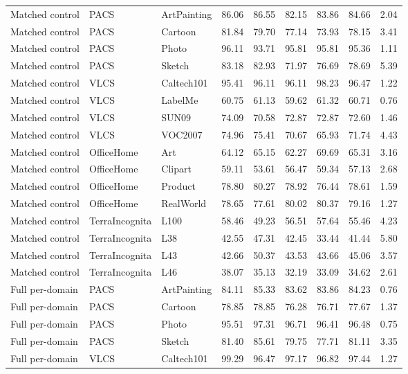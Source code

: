 \begin{longtable}{lllrrrrrr}
Matched control & PACS & ArtPainting & 86.06 & 86.55 & 82.15 & 83.86 & 84.66 & 2.04 \\
Matched control & PACS & Cartoon & 81.84 & 79.70 & 77.14 & 73.93 & 78.15 & 3.41 \\
Matched control & PACS & Photo & 96.11 & 93.71 & 95.81 & 95.81 & 95.36 & 1.11 \\
Matched control & PACS & Sketch & 83.18 & 82.93 & 71.97 & 76.69 & 78.69 & 5.39 \\
Matched control & VLCS & Caltech101 & 95.41 & 96.11 & 96.11 & 98.23 & 96.47 & 1.22 \\
Matched control & VLCS & LabelMe & 60.75 & 61.13 & 59.62 & 61.32 & 60.71 & 0.76 \\
Matched control & VLCS & SUN09 & 74.09 & 70.58 & 72.87 & 72.87 & 72.60 & 1.46 \\
Matched control & VLCS & VOC2007 & 74.96 & 75.41 & 70.67 & 65.93 & 71.74 & 4.43 \\
Matched control & OfficeHome & Art & 64.12 & 65.15 & 62.27 & 69.69 & 65.31 & 3.16 \\
Matched control & OfficeHome & Clipart & 59.11 & 53.61 & 56.47 & 59.34 & 57.13 & 2.68 \\
Matched control & OfficeHome & Product & 78.80 & 80.27 & 78.92 & 76.44 & 78.61 & 1.59 \\
Matched control & OfficeHome & RealWorld & 78.65 & 77.61 & 80.02 & 80.37 & 79.16 & 1.27 \\
Matched control & TerraIncognita & L100 & 58.46 & 49.23 & 56.51 & 57.64 & 55.46 & 4.23 \\
Matched control & TerraIncognita & L38 & 42.55 & 47.31 & 42.45 & 33.44 & 41.44 & 5.80 \\
Matched control & TerraIncognita & L43 & 42.66 & 50.37 & 43.53 & 43.66 & 45.06 & 3.57 \\
Matched control & TerraIncognita & L46 & 38.07 & 35.13 & 32.19 & 33.09 & 34.62 & 2.61 \\
Full per-domain & PACS & ArtPainting & 84.11 & 85.33 & 83.62 & 83.86 & 84.23 & 0.76 \\
Full per-domain & PACS & Cartoon & 78.85 & 78.85 & 76.28 & 76.71 & 77.67 & 1.37 \\
Full per-domain & PACS & Photo & 95.51 & 97.31 & 96.71 & 96.41 & 96.48 & 0.75 \\
Full per-domain & PACS & Sketch & 81.40 & 85.61 & 79.75 & 77.71 & 81.11 & 3.35 \\
Full per-domain & VLCS & Caltech101 & 99.29 & 96.47 & 97.17 & 96.82 & 97.44 & 1.27 \\

\end{longtable}
